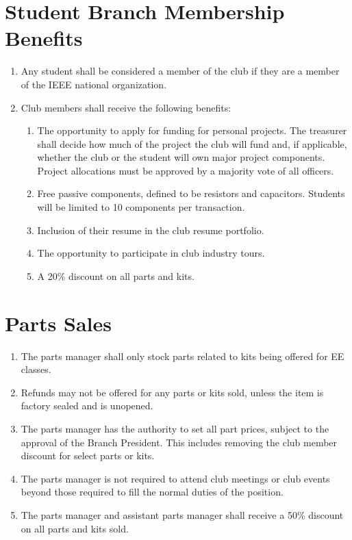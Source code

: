 \documentclass{article}
\begin{document}
\section{Student Branch Membership Benefits}
\begin{enumerate}
\item Any student shall be considered a member of the club if they are a member of the IEEE national organization.
\item Club members shall receive the following benefits:
  \begin{enumerate}
  \item The opportunity to apply for funding for personal projects. The treasurer shall decide how much of the project the club will fund and, if applicable, whether the club or the student will own major project components. Project allocations must be approved by a majority vote of all officers.
  \item Free passive components, defined to be resistors and capacitors. Students will be limited to 10 components per transaction.
  \item Inclusion of their resume in the club resume portfolio.
  \item The opportunity to participate in club industry tours.
  \item A 20\% discount on all parts and kits.
  \end{enumerate}
\end{enumerate}

\section{Parts Sales}
\begin{enumerate}
\item The parts manager shall only stock parts related to kits being offered for EE classes.
\item Refunds may not be offered for any parts or kits sold, unless the item is factory sealed and is unopened.
\item The parts manager has the authority to set all part prices, subject to the approval of the Branch President. This includes removing the club member discount for select parts or kits.
\item The parts manager is not required to attend club meetings or club events beyond those required to fill the normal duties of the position.
\item The parts manager and assistant parts manager shall receive a 50\% discount on all parts and kits sold.
\end{enumerate}
\end{document}
